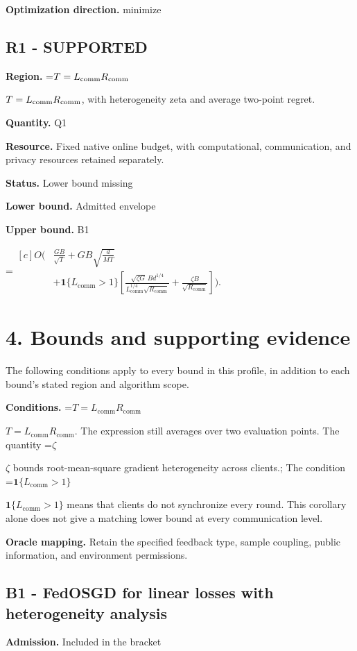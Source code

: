 \documentclass[10pt,a4paper]{article}
\newcommand{\AtlasMath}[1]{\par\begingroup\centering\setbox0=\hbox{$\displaystyle #1$}\ifdim\wd0>1.4\linewidth\typeout{ATLAS WIDE FORMULA: \the\wd0}\fi\ifdim\wd0>\linewidth\resizebox{\linewidth}{!}{\box0}\else\box0\fi\par\endgroup}
\newcommand{\AtlasInlineMath}[1]{\begingroup\setbox0=\hbox{$#1$}\ifdim\wd0>.4\linewidth\endgroup\AtlasMath{#1}\else\endgroup$#1$\fi}
\begin{document}
\textbf{Optimization direction.} minimize

\subsection{R1 - SUPPORTED}
\textbf{Region.} \AtlasInlineMath{T=L_{\rm comm} R_{\rm comm}}, with heterogeneity zeta and average two-point regret.

\textbf{Quantity.} Q1

\textbf{Resource.} Fixed native online budget, with computational, communication, and privacy resources retained separately.

\textbf{Status.} Lower bound missing

\textbf{Lower bound.} Admitted envelope

\textbf{Upper bound.} B1

\AtlasMath{\begin{aligned}[c]O\!\Bigg(&\frac{GB}{\sqrt T}+GB\sqrt{\frac d{MT}}\\ &+\mathbf1\{L_{\mathrm{comm}}>1\}\left[\frac{\sqrt{\zeta G}\,B d^{1/4}}{L_{\mathrm{comm}}^{1/4}\sqrt{R_{\mathrm{comm}}}}+\frac{\zeta B}{\sqrt{R_{\mathrm{comm}}}}\right]\Bigg).\end{aligned}}
\section{4. Bounds and supporting evidence}
The following conditions apply to every bound in this profile, in addition to each bound's stated region and algorithm scope.

\textbf{Conditions.} \AtlasInlineMath{T=L_{\mathrm{comm}}R_{\mathrm{comm}}}. The expression still averages over two evaluation points. The quantity \AtlasInlineMath{\zeta} bounds root-mean-square gradient heterogeneity across clients.; The condition \AtlasInlineMath{\mathbf1\{L_{\mathrm{comm}}>1\}} means that clients do not synchronize every round. This corollary alone does not give a matching lower bound at every communication level.

\textbf{Oracle mapping.} Retain the specified feedback type, sample coupling, public information, and environment permissions.

\subsection{B1 - FedOSGD for linear losses with heterogeneity analysis}
\textbf{Admission.} Included in the bracket
\end{document}
